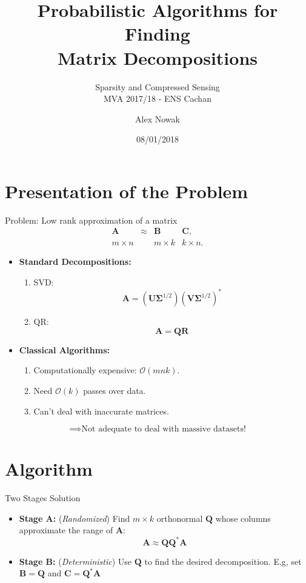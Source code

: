 \documentclass{beamer}
\title{Probabilistic Algorithms for Finding \\ Matrix Decompositions}
\subtitle{Sparsity and Compressed Sensing \\ MVA 2017/18 - ENS Cachan}
\author{Alex Nowak}
\date{08/01/2018}
\newcommand{\mtx}[1]{\bm{#1}}
\newcommand{\adj}{*}
\begin{document}
\begin{frame}
  \titlepage
\end{frame}


\section{Presentation of the Problem}

\begin{frame}{Problem: Low rank approximation of a matrix}
  $$\begin{array}{ccccccccccc}
    \mtx{A} &\approx& \mtx{B} & \mtx{C},\\
    m\times n && m \times k & k\times n.
    \end{array}$$
  \begin{itemize}
  \item {
    \textbf{Standard Decompositions:}
    \begin{enumerate}
      \item SVD: $$\mtx{A}=\left(\mtx{U}\mtx{\Sigma}^{1/2}\right)\left(\mtx{V}\mtx{\Sigma}^{1/2}\right)^\adj$$
      \item QR: $$\mtx{A}=\mtx{Q}\mtx{R}$$
    \end{enumerate}
  }
  \item {
    \textbf{Classical Algorithms:}
    \begin{enumerate}
      \item Computationally expensive: $\mathcal{O}(mnk)$.
      \item Need $\mathcal{O}(k)$ passes over data.
      \item Can't deal with inaccurate matrices.
    \end{enumerate}
  }
  \end{itemize}
  $$ \implies \text{Not adequate to deal with massive datasets!} $$
\end{frame}

\section{Algorithm}

\begin{frame}{Two Stages Solution}
\begin{itemize}
  \item \textbf{Stage A:} (\textit{Randomized}) Find $m\times k$ orthonormal $\mtx{Q}$ whose columns approximate the 
  range of $\mtx{A}$:
  $$ \mtx{A} \approx \mtx{Q}\mtx{Q}^\adj\mtx{A} $$
  \item \textbf{Stage B:} (\textit{Deterministic}) Use $\mtx{Q}$ to find the desired
  decomposition. E.g, set $\mtx{B}=\mtx{Q}$ and $\mtx{C}=\mtx{Q}^\adj\mtx{A}$
\end{itemize}
\end{frame}
\end{document}
